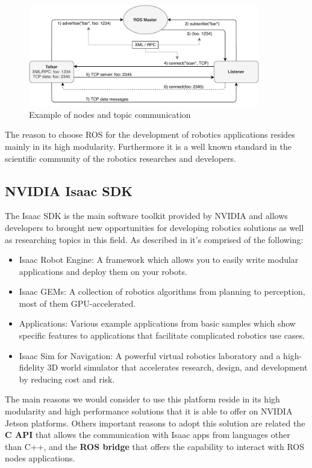 \begin{figure}[htbp]
	\centering
	\includegraphics[width=0.90\textwidth]{images/ROSexample2.pdf}
	\caption{Example of nodes and topic communication}
	\label{fig:ros-nodes-topics}
\end{figure}

The reason to choose ROS for the development of robotics applications resides mainly in its high modularity. Furthermore it is a well known standard in the scientific community of the robotics researches and developers.




\subsection{NVIDIA Isaac SDK}
The Isaac SDK is the main software toolkit provided by NVIDIA and allows developers to brought new opportunities for developing robotics solutions as well as researching topics in this field. As described in \cite{ISAAC} it's comprised of the following:
\begin{itemize}
	\item Isaac Robot Engine: A framework which allows you to easily write modular applications and deploy them on your robots.
	\item Isaac GEMs: A collection of robotics algorithms from planning to perception, most of them GPU-accelerated.
	\item Applications: Various example applications from basic samples which show specific features to applications that facilitate complicated robotics use cases.
	\item Isaac Sim for Navigation: A powerful virtual robotics laboratory and a high-fidelity 3D world simulator that accelerates research, design, and development by reducing cost and risk.
\end{itemize}

The main reasons we would consider to use this platform reside in its high modularity and high performance solutions that it is able to offer on NVIDIA Jetson platforms.
Others important reasons to adopt this solution are related the \textbf{C API} that allows the communication with Isaac apps from languages other than C++, and the \textbf{ROS bridge} that offers the capability to interact with ROS nodes applications.

